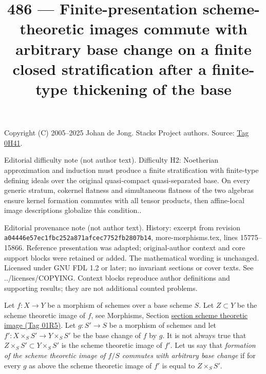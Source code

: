 \documentclass{amsart}
\theoremstyle{plain}
\theoremstyle{definition}
\theoremstyle{remark}
\numberwithin{equation}{subsection}
\begin{document}
\title[Stacks Project, Tag 0H41]{486 --- Finite-presentation scheme-theoretic images commute with arbitrary base change on a finite closed stratification after a finite-type thickening of the base}
\maketitle
\noindent Copyright (C) 2005--2025 Johan de Jong. Stacks Project authors. Source: \href{https://stacks.math.columbia.edu/tag/0H41}{Tag 0H41}.

\noindent Editorial difficulty note (not author text). Difficulty H2: Noetherian approximation and induction must produce a finite stratification with finite-type defining ideals over the original quasi-compact quasi-separated base. On every generic stratum, cokernel flatness and simultaneous flatness of the two algebras ensure kernel formation commutes with all tensor products, then affine-local image descriptions globalize this condition..

\noindent Editorial provenance note (not author text). History: excerpt from revision \texttt{a0444\allowbreak 6e57e\allowbreak c1fbc\allowbreak 252a8\allowbreak 71afc\allowbreak ec775\allowbreak 2fb28\allowbreak 07b14}, more-morphisms.tex, lines 15775--15866. Reference presentation was adapted; original-author context and core support blocks were retained or added. The mathematical wording is unchanged. Licensed under GNU FDL 1.2 or later; no invariant sections or cover texts. See ../licenses/COPYING. Context blocks reproduce author definitions and supporting results; they are not additional counted problems.

\noindent
Let $f : X \to Y$ be a morphism of schemes over a base scheme $S$.
Let $Z \subset Y$ be the scheme theoretic image of $f$, see
Morphisms, Section \href{https://stacks.math.columbia.edu/tag/01R5}{section scheme theoretic image (Tag 01R5)}.
Let $g : S' \to S$ be a morphism of schemes and let
$f' : X \times_S S' \to Y \times_S S'$ be the base change of $f$ by $g$.
It is not always true that $Z \times_S S' \subset Y \times_S S'$
is the scheme theoretic image of $f'$.
Let us say that {\it formation of the scheme theoretic image of $f/S$
commutes with arbitrary base change} if for every $g$ as above
the scheme theoretic image of $f'$ is equal to $Z \times_S S'$.
\end{document}
